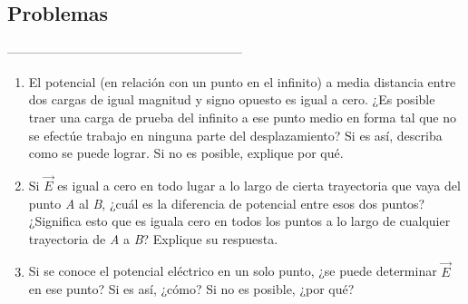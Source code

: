 \subsection{Problemas}
--------------------------------------------------------


\np
\begin{enumerate}[label=\alph*)]
    \item El potencial (en relación con un punto en el infinito) a media distancia entre dos cargas de igual magnitud y signo opuesto es igual a cero. ¿Es posible traer una carga de prueba del infinito a ese punto medio en forma tal que no se efectúe trabajo en ninguna parte del desplazamiento? Si es así, describa como se puede lograr. Si no es posible, explique por qué.
    \item Si $\Vec{E}$ es igual a cero en todo lugar a lo largo de cierta trayectoria que vaya del punto \textit{A} al \textit{B}, ¿cuál es la diferencia de potencial entre esos dos puntos? ¿Significa esto que es iguala cero en todos los puntos a lo largo de cualquier trayectoria de \textit{A} a \textit{B}? Explique su respuesta.
    \item Si se conoce el potencial eléctrico en un solo punto, ¿se puede determinar $\Vec{E}$ en ese punto? Si es así, ¿cómo? Si no es posible, ¿por qué?
\end{enumerate}

